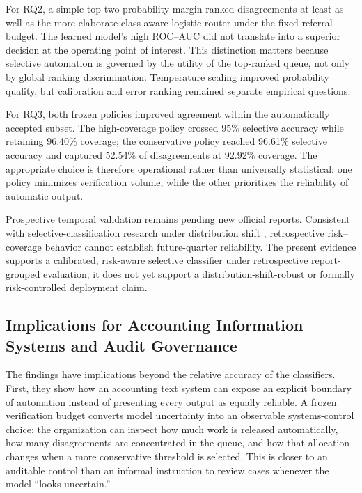 \documentclass[11pt]{article}
\begin{document}
For RQ2, a simple top-two probability margin ranked disagreements at least as well
as the more elaborate class-aware logistic router under the fixed referral budget.
The learned model's high ROC--AUC did not translate into a superior decision at
the operating point of interest. This distinction matters because selective
automation is governed by the utility of the top-ranked queue, not only by global
ranking discrimination. Temperature scaling improved probability quality, but
calibration and error ranking remained separate empirical questions.

For RQ3, both frozen policies improved agreement within the automatically accepted
subset. The high-coverage policy crossed 95\% selective accuracy while retaining
96.40\% coverage; the conservative policy reached 96.61\% selective accuracy and
captured 52.54\% of disagreements at 92.92\% coverage. The appropriate
choice is therefore operational rather than universally statistical: one policy
minimizes verification volume, while the other prioritizes the reliability of
automatic output.

Prospective temporal validation remains pending new official reports. Consistent
with selective-classification research under distribution shift
\cite{liang2024shift}, retrospective risk--coverage behavior cannot establish
future-quarter reliability. The present evidence supports a calibrated,
risk-aware selective classifier under retrospective report-grouped evaluation; it
does not yet support a distribution-shift-robust or formally risk-controlled
deployment claim.

\subsection{Implications for Accounting Information Systems and Audit Governance}

The findings have implications beyond the relative accuracy of the classifiers.
First, they show how an accounting text system can expose an explicit boundary of
automation instead of presenting every output as equally reliable. A frozen
verification budget converts model uncertainty into an observable systems-control
choice: the organization can inspect how much work is released automatically,
how many disagreements are concentrated in the queue, and how that allocation
changes when a more conservative threshold is selected. This is closer to an
auditable control than an informal instruction to review cases whenever the model
``looks uncertain.''
\end{document}
